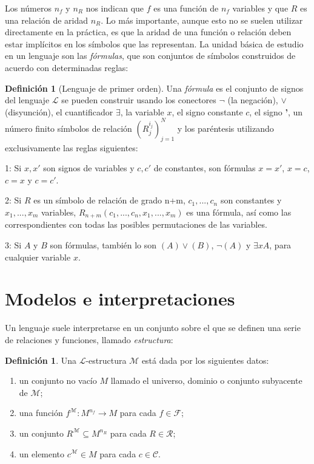 \documentclass[11pt,a4paper]{book}
\theoremstyle{plain}
\theoremstyle{definition}
\newtheorem{definicion}[teorema]{Definición}
\theoremstyle{remark}
\begin{document}
Los números $n_f$ y $n_R$ nos indican que $f$ es una función de $n_f$ variables y que $R$ es una relación de aridad $n_R$. Lo más importante, aunque esto no se suelen utilizar directamente en la práctica, es que la aridad de una función o relación deben estar implícitos en los símbolos que las representan. La unidad básica de estudio en un lenguaje son las \textit{fórmulas}, que son conjuntos de símbolos construidos de acuerdo con determinadas reglas:


\begin{definicion}[Lenguaje de primer orden]
\label{definicion-formula}
Una \textit{fórmula} es el conjunto de signos del lenguaje $\mathcal{L}$ se pueden construir usando los conectores $\neg$ (la negación), $\vee$ (disyunción), el cuantificador $\exists$, la variable $x$, el signo constante $c$, el signo \textbf{'}, un número finito símbolos de relación $(R_j^{i_j})_{j=1}^N$ y los paréntesis utilizando exclusivamente las reglas siguientes:

1: Si $x,x'$ son signos de variables y $c,c'$ de constantes, son fórmulas $x=x'$, $x=c$, $c=x$ y $c=c'$.

2: Si $R$ es un símbolo de relación de grado n+m, $c_1,...,c_n$ son constantes y $x_1,...,x_m$ variables, $R_{n+m}(c_1,...,c_n,x_1,...,x_m)$ es una fórmula, así como las correspondientes con todas las posibles permutaciones de las variables.

3: Si $A$ y $B$ son fórmulas, también lo son $(A) \vee (B)$, $\neg (A)$ y $\exists x A$, para cualquier variable $x$.

\end{definicion}

\section{Modelos e interpretaciones}

Un lenguaje suele interpretarse en un conjunto sobre el que se definen una serie de relaciones y funciones, llamado \textit{estructura}:

\begin{definicion}\label{def-estructura}
Una $\mathcal{L}$-estructura $\mathcal{M}$ está dada por los siguientes datos:
\begin{enumerate}
    \item[(i)] un conjunto no vacío $M$ llamado el universo, dominio o conjunto subyacente de $\mathcal{M}$;
    \item[(ii)] una función $f^{\mathcal{M}} : M^{n_f} \to M$ para cada $f \in \mathcal{F}$;
    \item[(iii)] un conjunto $R^{\mathcal{M}} \subseteq M^{n_R}$ para cada $R \in \mathcal{R}$;
    \item[(iv)] un elemento $c^{\mathcal{M}} \in M$ para cada $c \in \mathcal{C}$.
\end{enumerate}
\end{definicion}
\end{document}
